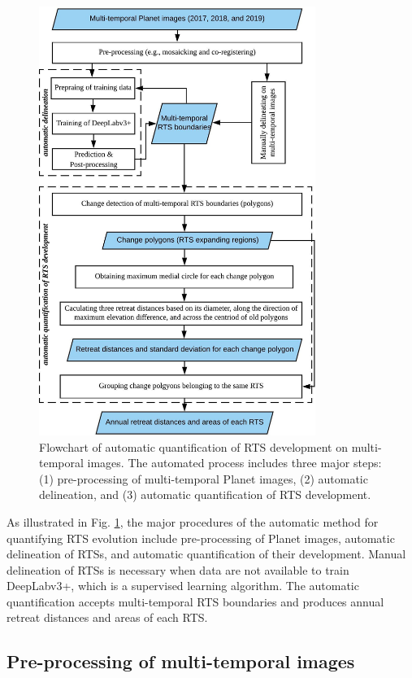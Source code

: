 \documentclass[authoryear,preprint,review,12pt]{elsarticle}
\begin{document}
\begin{figure}
	\centering
	\includegraphics[width=9cm]{figs/polygon_based_change_detection_flowchart.jpg}
	\caption{Flowchart of automatic quantification of RTS development on multi-temporal images. The automated process includes three major steps: (1) pre-processing of multi-temporal Planet images, (2) automatic delineation, and (3) automatic quantification of RTS development.}
	\label{fig_flowchart}
\end{figure}

 As illustrated in Fig. \ref{fig_flowchart}, the major procedures of the automatic method for quantifying RTS evolution include pre-processing of Planet images, automatic delineation of RTSs, and automatic quantification of their development. 
Manual delineation of RTSs is necessary when data are not available to train DeepLabv3+, which is a supervised learning algorithm. %
The automatic quantification accepts multi-temporal RTS boundaries %
and produces annual retreat distances and areas of each RTS. 


\subsection{Pre-processing of multi-temporal images}
\label{sec_preprocessing}
\end{document}
